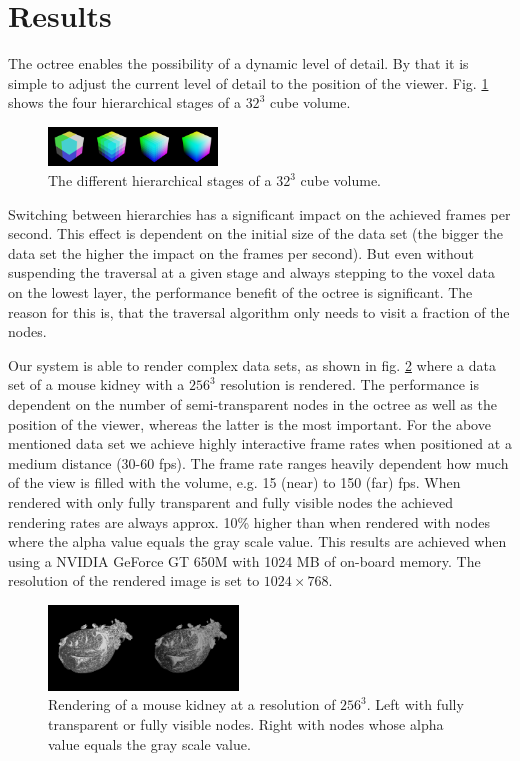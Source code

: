 \documentclass[12pt,conference]{IEEEtran}
\begin{document}
\section{Results}
\label{results}
The octree enables the possibility of a dynamic level of detail. By that it is simple to adjust the current level of detail to the position of the viewer. Fig. \ref{fig:hierarchiesCube} shows the four hierarchical stages of a $32^3$ cube volume. 
\begin{figure}[htp]
	\centering
	\includegraphics[width=0.4\textwidth]{images/cube_hierarchy.png}
	\caption{The different hierarchical stages of a $32^3$ cube volume.}
	\label{fig:hierarchiesCube}
\end{figure}

Switching between hierarchies has a significant impact on the achieved frames per second. This effect is dependent on the initial size of the data set (the bigger the data set the higher the impact on the frames per second). But even without suspending the traversal at a given stage and always stepping to the voxel data on the lowest layer, the performance benefit of the octree is significant. The reason for this is, that the traversal algorithm only needs to visit a fraction of the nodes.
\par
Our system is able to render complex data sets, as shown in fig. \ref{fig:kidneyRendering} where a data set of a mouse kidney with a $256^3$ resolution is rendered. The performance is dependent on the number of semi-transparent nodes in the octree as well as the position of the viewer, whereas the latter is the most important. For the above mentioned data set we achieve highly interactive frame rates when positioned at a medium distance (30-60 fps). The frame rate ranges heavily dependent how much of the view is filled with the volume, e.g. 15 (near) to 150 (far) fps. When rendered with only fully transparent and fully visible nodes the achieved rendering rates are always approx. 10\% higher than when rendered with nodes where the alpha value equals the gray scale value.
This results are achieved when using a NVIDIA GeForce GT 650M with 1024 MB of on-board memory. The resolution of the rendered image is set to $1024\times 768$.

\begin{figure}[htp]
	\centering
	\includegraphics[width=0.45\textwidth]{images/kidney_256x256x256.PNG}
	\caption{Rendering of a mouse kidney at a resolution of $256^3$. Left with fully transparent or fully visible nodes. Right with nodes whose alpha value equals the gray scale value.}
	\label{fig:kidneyRendering}
\end{figure}
\end{document}
